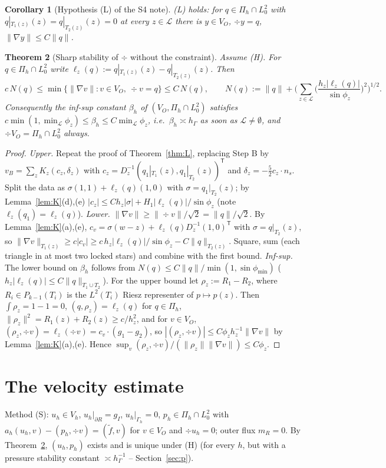 \documentclass[11pt]{article}
\newtheorem{theorem}{Theorem}
\newtheorem{corollary}[theorem]{Corollary}
\theoremstyle{remark}
\newcommand{\hG}{h_\Gamma}
\newcommand{\VO}{V_O}
\newcommand{\Pih}{\Pi_h}
\newcommand{\Lk}{\mathcal L}
\newcommand{\norm}[1]{\|#1\|}
\begin{document}
\begin{corollary}[Hypothesis (L) of the S4 note]\label{cor:L}
(L) holds: for $q\in\Pih\cap L^2_0$ with $q|_{T_1(z)}(z)=q|_{T_2(z)}(z)=0$ at every $z\in\Lk$ there is $y\in\VO$,
$\div y=q$, $\norm{\nabla y}\le C\norm q$.
\end{corollary}

\begin{theorem}[Sharp stability of $\div$ without the constraint]\label{thm:sharp}
Assume (H). For $q\in\Pih\cap L^2_0$ write $\ell_z(q):=q|_{T_1(z)}(z)-q|_{T_2(z)}(z)$. Then
\[
c\,N(q)\le\min\{\norm{\nabla v}:v\in\VO,\ \div v=q\}\le C\,N(q),\qquad
N(q):=\norm q+\Big(\sum_{z\in\Lk}\Big(\frac{h_z|\ell_z(q)|}{\sin\phi_z}\Big)^2\Big)^{1/2}.
\]
Consequently the inf-sup constant $\beta_h$ of $(\VO,\Pih\cap L^2_0)$ satisfies
$c\min(1,\min_{\Lk}\phi_z)\le\beta_h\le C\min_{\Lk}\phi_z$, i.e.\ $\beta_h\asymp\hG$ as soon as $\Lk\ne\emptyset$,
and $\div\VO=\Pih\cap L^2_0$ always.
\end{theorem}
\begin{proof}
\emph{Upper.} Repeat the proof of Theorem~\ref{thm:L}, replacing Step B by $v_B=\sum_zK_z(c_z,\delta_z)$ with
$c_z=D_z^{-1}(q_1|_{T_1}(z),q_1|_{T_2}(z))^{\mathsf T}$ and $\delta_z=-\frac52c_z\cdot n_s$. Split the data as
$\sigma(1,1)+\ell_z(q)(1,0)$ with $\sigma=q_1|_{T_2}(z)$; by Lemma~\ref{lem:K}(d),(e)
$|c_z|\le C h_z|\sigma|+H_1|\ell_z(q)|/\sin\phi_z$ (note $\ell_z(q_1)=\ell_z(q)$).
\emph{Lower.} $\norm{\nabla v}\ge\norm{\div v}/\sqrt2=\norm q/\sqrt2$. By Lemma~\ref{lem:K}(a),(e),
$c_v=\sigma(w-z)+\ell_z(q)D_z^{-1}(1,0)^{\mathsf T}$ with $\sigma=q|_{T_2}(z)$, so
$\norm{\nabla v}_{T_1(z)}\ge c|c_v|\ge c\,h_z|\ell_z(q)|/\sin\phi_z-C\norm q_{T_2(z)}$. Square, sum (each triangle in at
most two locked stars) and combine with the first bound.
\emph{Inf-sup.} The lower bound on $\beta_h$ follows from $N(q)\le C\norm q/\min(1,\sin\phi_{\min})$
($h_z|\ell_z(q)|\le C\norm q_{T_1\cup T_2}$). For the upper bound let $\rho_z:=R_1-R_2$, where $R_i\in P_{k-1}(T_i)$ is the
$L^2(T_i)$ Riesz representer of $p\mapsto p(z)$. Then $\int\rho_z=1-1=0$, $(q,\rho_z)=\ell_z(q)$ for $q\in\Pih$,
$\norm{\rho_z}^2=R_1(z)+R_2(z)\ge c/h_z^2$, and for $v\in\VO$, $(\rho_z,\div v)=\ell_z(\div v)=c_v\cdot(g_1-g_2)$,
so $|(\rho_z,\div v)|\le C\phi_zh_z^{-1}\norm{\nabla v}$ by Lemma~\ref{lem:K}(a),(e). Hence
$\sup_v(\rho_z,\div v)/(\norm{\rho_z}\norm{\nabla v})\le C\phi_z$.
\end{proof}

\section{The velocity estimate}
Method (S): $u_h\in V_h$, $u_h|_{\partial R}=g_I$, $u_h|_{\Gamma_h}=0$, $p_h\in\Pih\cap L^2_0$ with
$a_h(u_h,v)-(p_h,\div v)=(\tilde f,v)$ for $v\in\VO$ and $\div u_h=0$; outer flux $m_R=0$.
By Theorem~\ref{thm:sharp}, $(u_h,p_h)$ exists and is unique under (H) (for every $h$, but with a pressure
stability constant $\asymp\hG^{-1}$ -- Section~\ref{sec:p}).
\end{document}
